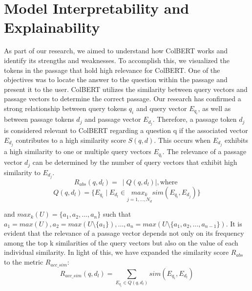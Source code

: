 \documentclass[11pt]{article}
\begin{document}
\section{Model Interpretability and Explainability}
As part of our research, we aimed to understand how ColBERT works and identify its strengths and weaknesses.
To accomplish this, we visualized the tokens in the passage that hold high relevance for ColBERT. One of the objectives
was to locate the answer to the question within the passage and present it to the user.
ColBERT utilizes the similarity between query vectors and passage vectors to determine the correct passage.
Our research has confirmed a strong relationship between query tokens $q_i$ and query vector $E_{q_i}$, as well as between
passage tokens $d_j$ and passage vector $E_{d_j}$.
Therefore, a passage token $d_j$ is considered relevant to ColBERT regarding
a question q if the associated vector $E_{d_j}$ contributes to a high similarity score $S(q, d)$.
This occurs when $E_{d_j}$ exhibits a high similarity to one or multiple query vectors $E_{q_i}$.
The relevance of a passage vector $d_j$ can be determined by the number of query vectors that exhibit high similarity
to $E_{d_j}$.
$$
    R_{abs}(q, d_l) = \:\mid Q(q, d_l) \mid, \text{where }
$$
$$
  Q(q, d_l) = \{E_{q_i} \mid E_{d_l} \in \underset{j = 1, \dots, N_d}{max_k} sim(E_{q_i}, E_{d_j})\}
$$

and $max_k(U) = \{a_1, a_2, \dots, a_n\}$ such that $a_1 = max(U), a_2 = max(U \setminus \{a_1\}), \dots, a_n = max(U \setminus \{a_1, a_2, \dots, a_{n-1}\})$. It is evident that the relevance of a passage vector depends not only on its frequency among the top k similarities of the query vectors but also on the value of each individual similarity. In light of this, we have expanded the similarity score $R_{abs}$ to the metric $R_{acc\_sim}$:
$$
	R_{acc\_sim}(q, d_l) = \sum_{E_{q_i} \in Q(q, d_l)} sim(E_{q_i}, E_{d_l}) 
$$
\end{document}
